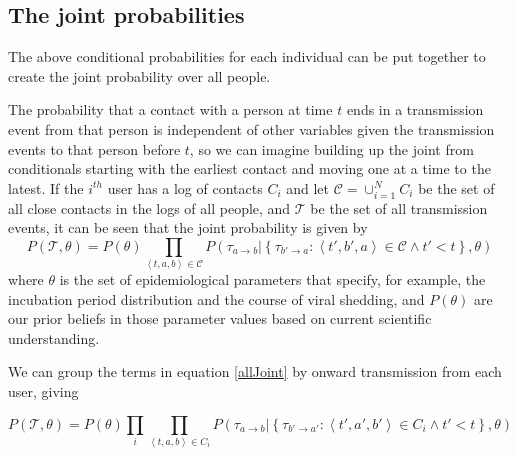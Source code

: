 \documentclass{article}
\begin{document}
\subsection{The joint probabilities}

The above conditional probabilities for each individual can be put together to create the joint probability over all people.

The probability that a contact with a person at time $t$ ends in a transmission event from that person is independent of other variables given the transmission events to that person before $t$, so we can imagine building up the joint from conditionals starting with the earliest contact and moving one at a time to the latest. If the $i^{th}$ user has a log of contacts $C_i$ and let $\mathcal{C} = \cup_{i=1}^N C_i$ be the set of all close contacts in the logs of all people, and $\mathcal{T}$ be the set of all transmission events, it can be seen that the joint probability is given by
\begin{equation}
P(\mathcal{T},\theta) =
P(\theta)
\prod_{\left<t,a,b\right> \in \mathcal{C}}
P\left(\tau_{a\rightarrow b}|
  \left\{ \tau_{b' \rightarrow a} :
    \left<t',b',a\right> \in \mathcal{C} \wedge
    t' < t
  \right\},\theta
\right)
\label{allJoint}
\end{equation}
where $\theta$ is the set of epidemiological parameters that specify, for example, the incubation period distribution and the course of viral shedding, and $P(\theta)$ are our prior beliefs in those parameter values based on current scientific understanding.

We can group the terms in equation \ref{allJoint} by onward transmission from each user, giving

\[
P(\mathcal{T},\theta) =
P(\theta)\prod_{i}
\prod_{\left<t,a,b\right> \in C_i}
P\left(\tau_{a\rightarrow b}|
  \left\{ \tau_{b'\rightarrow a'}:
    \left<t',a',b'\right> \in C_i \wedge
    t' < t 
  \right\},\theta
\right)
\]
\end{document}
